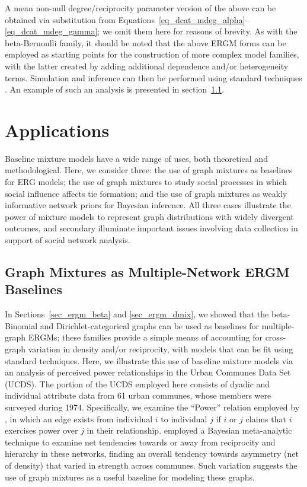 \documentclass[11pt]{article}
\begin{document}
A mean non-null degree/reciprocity parameter version of the above can be obtained via substitution from Equations~\ref{eq_dcat_mdeg_alpha}--\ref{eq_dcat_mdeg_gamma}; we omit them here for reasons of brevity.   As with the beta-Bernoulli family, it should be noted that the above ERGM forms can be employed as starting points for the construction of more complex model families, with the latter created by adding additional dependence and/or heterogeneity terms.  Simulation and inference can then be performed using standard techniques \citep[e.g.][]{snijders:joss:2002,hunter.et.al:jss:2008}.  An example of such an analysis is presented in section~\ref{sec_ergapp}.

\section{Applications} \label{sec_applications}


Baseline mixture models have a wide range of uses, both theoretical and methodological.  Here, we consider three: the use of graph mixtures as baselines for ERG models; the use of graph mixtures to study social processes in which social influence affects tie formation; and the use of graph mixtures as weakly informative network priors for Bayesian inference.  All three cases illustrate the power of mixture models to represent graph distributions with widely divergent outcomes, and secondary illuminate important issues involving data collection in support of social network analysis.

\subsection{Graph Mixtures as Multiple-Network ERGM Baselines} \label{sec_ergapp}

In Sections~\ref{sec_ergm_beta} and \ref{sec_ergm_dmix}, we showed that the beta-Binomial and Dirichlet-categorical graphs can be used as baselines for multiple-graph ERGMs; these families provide a simple means of accounting for cross-graph variation in density and/or reciprocity, with models that can be fit using standard techniques.  Here, we illustrate this use of baseline mixture models via an analysis of perceived power relationships in the Urban Communes Data Set \citep{zablocki:bk:1980} (UCDS).  The portion of the UCDS employed here consists of dyadic and individual attribute data from 61 urban communes, whose members were surveyed during 1974.  Specifically, we examine the ``Power'' relation employed by \citet{butts:sm:2011a}, in which an edge exists from individual $i$ to individual $j$ if $i$ or $j$ claims that $i$ exercises power over $j$ in their relationship.  \citet{butts:sm:2011a} employed a Bayesian meta-analytic technique to examine net tendencies towards or away from reciprocity and hierarchy in these networks, finding an overall tendency towards asymmetry (net of density) that varied in strength across communes.  Such variation suggests the use of graph mixtures as a useful baseline for modeling these graphs.
\end{document}
